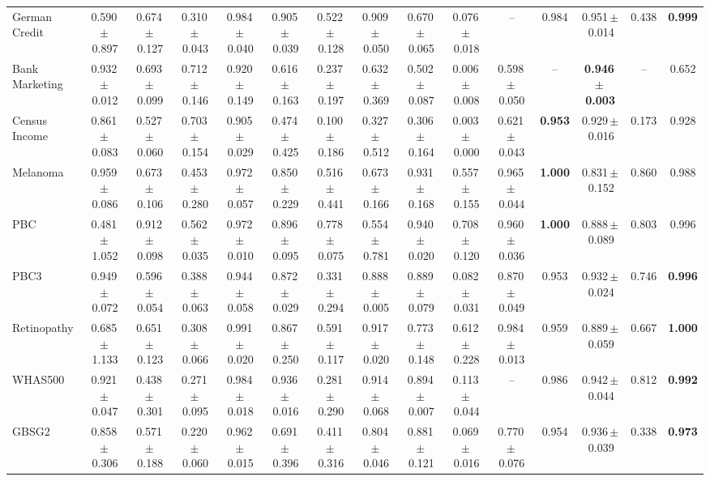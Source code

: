 \documentclass[8pt]{extarticle}
\begin{document}
\begin{longtable}{l*{14}{c}}
German Credit & 0.590\,$\pm$\,0.897 & 0.674\,$\pm$\,0.127 & 0.310\,$\pm$\,0.043 & 0.984\,$\pm$\,0.040 & 0.905\,$\pm$\,0.039 & 0.522\,$\pm$\,0.128 & 0.909\,$\pm$\,0.050 & 0.670\,$\pm$\,0.065 & 0.076\,$\pm$\,0.018 & -- & 0.984 & 0.951\,$\pm$\,0.014 & 0.438 & \textbf{0.999} \\
Bank Marketing & 0.932\,$\pm$\,0.012 & 0.693\,$\pm$\,0.099 & 0.712\,$\pm$\,0.146 & 0.920\,$\pm$\,0.149 & 0.616\,$\pm$\,0.163 & 0.237\,$\pm$\,0.197 & 0.632\,$\pm$\,0.369 & 0.502\,$\pm$\,0.087 & 0.006\,$\pm$\,0.008 & 0.598\,$\pm$\,0.050 & -- & \textbf{0.946\,$\pm$\,0.003} & -- & 0.652 \\
Census Income & 0.861\,$\pm$\,0.083 & 0.527\,$\pm$\,0.060 & 0.703\,$\pm$\,0.154 & 0.905\,$\pm$\,0.029 & 0.474\,$\pm$\,0.425 & 0.100\,$\pm$\,0.186 & 0.327\,$\pm$\,0.512 & 0.306\,$\pm$\,0.164 & 0.003\,$\pm$\,0.000 & 0.621\,$\pm$\,0.043 & \textbf{0.953} & 0.929\,$\pm$\,0.016 & 0.173 & 0.928 \\
Melanoma & 0.959\,$\pm$\,0.086 & 0.673\,$\pm$\,0.106 & 0.453\,$\pm$\,0.280 & 0.972\,$\pm$\,0.057 & 0.850\,$\pm$\,0.229 & 0.516\,$\pm$\,0.441 & 0.673\,$\pm$\,0.166 & 0.931\,$\pm$\,0.168 & 0.557\,$\pm$\,0.155 & 0.965\,$\pm$\,0.044 & \textbf{1.000} & 0.831\,$\pm$\,0.152 & 0.860 & 0.988 \\
PBC & 0.481\,$\pm$\,1.052 & 0.912\,$\pm$\,0.098 & 0.562\,$\pm$\,0.035 & 0.972\,$\pm$\,0.010 & 0.896\,$\pm$\,0.095 & 0.778\,$\pm$\,0.075 & 0.554\,$\pm$\,0.781 & 0.940\,$\pm$\,0.020 & 0.708\,$\pm$\,0.120 & 0.960\,$\pm$\,0.036 & \textbf{1.000} & 0.888\,$\pm$\,0.089 & 0.803 & 0.996 \\
PBC3 & 0.949\,$\pm$\,0.072 & 0.596\,$\pm$\,0.054 & 0.388\,$\pm$\,0.063 & 0.944\,$\pm$\,0.058 & 0.872\,$\pm$\,0.029 & 0.331\,$\pm$\,0.294 & 0.888\,$\pm$\,0.005 & 0.889\,$\pm$\,0.079 & 0.082\,$\pm$\,0.031 & 0.870\,$\pm$\,0.049 & 0.953 & 0.932\,$\pm$\,0.024 & 0.746 & \textbf{0.996} \\
Retinopathy & 0.685\,$\pm$\,1.133 & 0.651\,$\pm$\,0.123 & 0.308\,$\pm$\,0.066 & 0.991\,$\pm$\,0.020 & 0.867\,$\pm$\,0.250 & 0.591\,$\pm$\,0.117 & 0.917\,$\pm$\,0.020 & 0.773\,$\pm$\,0.148 & 0.612\,$\pm$\,0.228 & 0.984\,$\pm$\,0.013 & 0.959 & 0.889\,$\pm$\,0.059 & 0.667 & \textbf{1.000} \\
WHAS500 & 0.921\,$\pm$\,0.047 & 0.438\,$\pm$\,0.301 & 0.271\,$\pm$\,0.095 & 0.984\,$\pm$\,0.018 & 0.936\,$\pm$\,0.016 & 0.281\,$\pm$\,0.290 & 0.914\,$\pm$\,0.068 & 0.894\,$\pm$\,0.007 & 0.113\,$\pm$\,0.044 & -- & 0.986 & 0.942\,$\pm$\,0.044 & 0.812 & \textbf{0.992} \\
GBSG2 & 0.858\,$\pm$\,0.306 & 0.571\,$\pm$\,0.188 & 0.220\,$\pm$\,0.060 & 0.962\,$\pm$\,0.015 & 0.691\,$\pm$\,0.396 & 0.411\,$\pm$\,0.316 & 0.804\,$\pm$\,0.046 & 0.881\,$\pm$\,0.121 & 0.069\,$\pm$\,0.016 & 0.770\,$\pm$\,0.076 & 0.954 & 0.936\,$\pm$\,0.039 & 0.338 & \textbf{0.973} \\

\end{longtable}
\end{document}
